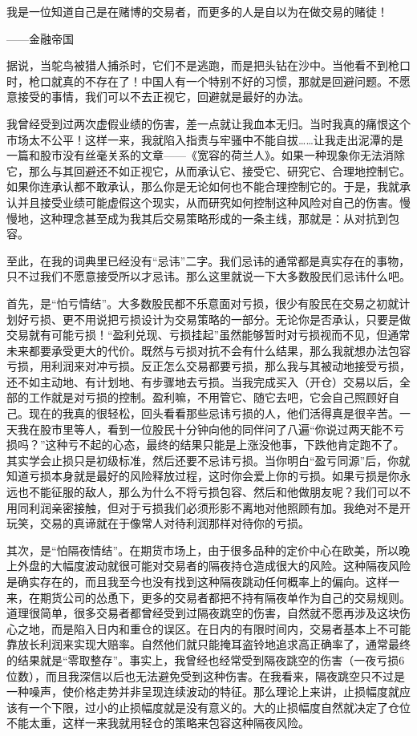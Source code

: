 {\kaishu
我是一位知道自己是在赌博的交易者，而更多的人是自以为在做交易的赌徒！

\hfill ——金融帝国
}

据说，当鸵鸟被猎人捕杀时，它们不是逃跑，而是把头钻在沙中。当他看不到枪口时，枪口就真的不存在了！中国人有一个特别不好的习惯，那就是回避问题。不愿意接受的事情，我们可以不去正视它，回避就是最好的办法。

我曾经受到过两次虚假业绩的伤害，差一点就让我血本无归。当时我真的痛恨这个市场太不公平！这样一来，我就陷入指责与牢骚中不能自拔……让我走出泥潭的是一篇和股市没有丝毫关系的文章——《宽容的荷兰人》。如果一种现象你无法消除它，那么与其回避还不如正视它，从而承认它、接受它、研究它、合理地控制它。如果你连承认都不敢承认，那么你是无论如何也不能合理控制它的。于是，我就承认并且接受业绩可能虚假这个现实，从而研究如何控制这种风险对自己的伤害。慢慢地，这种理念甚至成为我其后交易策略形成的一条主线，那就是：从对抗到包容。

至此，在我的词典里已经没有“忌讳”二字。我们忌讳的通常都是真实存在的事物，只不过我们不愿意接受所以才忌讳。那么这里就说一下大多数股民们忌讳什么吧。

首先，是“怕亏情结”。大多数股民都不乐意面对亏损，很少有股民在交易之初就计划好亏损、更不用说把亏损设计为交易策略的一部分。无论你是否承认，只要是做交易就有可能亏损！“盈利兑现、亏损挂起”虽然能够暂时对亏损视而不见，但通常未来都要承受更大的代价。既然与亏损对抗不会有什么结果，那么我就想办法包容亏损，用利润来对冲亏损。反正怎么交易都要亏损，那么我与其被动地接受亏损，还不如主动地、有计划地、有步骤地去亏损。当我完成买入（开仓）交易以后，全部的工作就是对亏损的控制。盈利嘛，不用管它、随它去吧，它会自己照顾好自己。现在的我真的很轻松，回头看看那些忌讳亏损的人，他们活得真是很辛苦。一天我在股市里等人，看到一位股民十分钟向他的同伴问了八遍“你说过两天能不亏损吗？”这种亏不起的心态，最终的结果只能是上涨没他事，下跌他肯定跑不了。其实学会止损只是初级标准，然后还要不忌讳亏损。当你明白“盈亏同源”后，你就知道亏损本身就是最好的风险释放过程，这时你会爱上你的亏损。如果亏损是你永远也不能征服的敌人，那么为什么不将亏损包容、然后和他做朋友呢？我们可以不用同利润亲密接触，但对于亏损我们必须形影不离地对他照顾有加。我绝对不是开玩笑，交易的真谛就在于像常人对待利润那样对待你的亏损。

其次，是“怕隔夜情结”。在期货市场上，由于很多品种的定价中心在欧美，所以晚上外盘的大幅度波动就很可能对交易者的隔夜持仓造成很大的风险。这种隔夜风险是确实存在的，而且我至今也没有找到这种隔夜跳动任何概率上的偏向。这样一来，在期货公司的怂恿下，更多的交易者都把不持有隔夜单作为自己的交易规则。道理很简单，很多交易者都曾经受到过隔夜跳空的伤害，自然就不愿再涉及这块伤心之地，而是陷入日内和重仓的误区。在日内的有限时间内，交易者基本上不可能靠放长利润来实现大赔率。自然他们就只能掩耳盗铃地追求高正确率了，通常最终的结果就是“零取整存”。事实上，我曾经也经常受到隔夜跳空的伤害（一夜亏损6位数），而且我深信以后也无法避免受到这种伤害。在我看来，隔夜跳空只不过是一种噪声，使价格走势并非呈现连续波动的特征。那么理论上来讲，止损幅度就应该有一个下限，过小的止损幅度就是没有意义的。大的止损幅度自然就决定了仓位不能太重，这样一来我就用轻仓的策略来包容这种隔夜风险。

